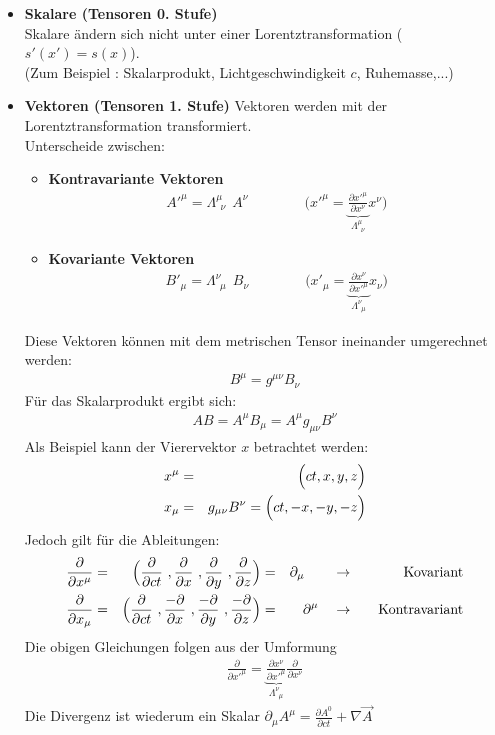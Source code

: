 \begin{itemize}
\item {\bf Skalare (Tensoren 0. Stufe) }\\  Skalare ändern sich nicht unter einer Lorentztransformation ($s'(x') = s(x)$).\\
(Zum Beispiel : Skalarprodukt, Lichtgeschwindigkeit $c$, Ruhemasse,...)
\item {\bf Vektoren (Tensoren 1. Stufe)} Vektoren werden mit der Lorentztransformation transformiert.\\
Unterscheide zwischen:
\begin{itemize}
\item {\bf Kontravariante Vektoren}\\
\begin{eqnarray*} {A'}^{\mu} = \Lambda_{\ \ \nu}^{\mu} \ \ A^{\nu} \qquad \qquad
\big ( {x'}^{\mu} = \underbrace{\frac{\partial {x'}^{\mu}}{\partial x^\nu}}_{\Lambda_{\ \ \nu}^{\mu}} x^{\nu} \big)
\end{eqnarray*}
\item{\bf Kovariante Vektoren}\\ \begin{eqnarray*} B'_{\mu} = \Lambda_{\ \ \mu}^{\nu}\ \ B_{\nu} \qquad \qquad \big ( x'_{\mu} = \underbrace{\frac{\partial x^{\nu}}{\partial {x'}^{\mu}}}_{\Lambda_{\ \ \mu}^{\nu}}x_{\nu} \big )\end{eqnarray*}
\end{itemize}
Diese Vektoren können mit dem metrischen Tensor ineinander umgerechnet werden:
\begin{eqnarray*} B^{\mu} = g^{\mu\nu} B_{\nu}\end{eqnarray*}
Für das Skalarprodukt ergibt sich:
\begin{eqnarray*} AB = A^{\mu}B_{\mu} = A^{\mu} g_{\mu\nu} B^{\nu} \end{eqnarray*}
Als Beispiel kann der Vierervektor $x$ betrachtet werden:
\begin{eqnarray*}
x^{\mu} &=& \Big ( ct, x,y,z \Big)\\ x_{\mu} &=& g_{\mu\nu} B^{\nu} = \Big ( ct, -x,-y,-z\Big)
\end{eqnarray*}
Jedoch gilt für die Ableitungen:
\begin{alignat*}{6} \frac{\partial}{\partial x^{\mu}} \g \Big(\frac{\partial}{\partial ct}\ ,\frac{\partial}{\partial x} \ ,\frac{\partial}{\partial y}\ ,\frac{\partial}{\partial z} \Big ) \g \partial_{\mu} \qquad&\rightarrow& \quad \text{Kovariant}\\
\frac{\partial}{\partial x_{\mu}} \g \Big ( \frac{\partial}{\partial ct}\ ,\frac{-\partial}{\partial x}\ , \frac{-\partial}{\partial y}\ ,\frac{-\partial}{\partial z}\Big ) \g \partial^{\mu} \quad &\rightarrow& \quad \text{Kontravariant}
\end{alignat*}
Die obigen Gleichungen folgen aus der Umformung
\begin{eqnarray*} \frac{\partial}{\partial{x'}^{\mu}} = \underbrace{\frac{\partial x^{\nu}}{\partial{x'}^{\mu}}}_{\Lambda_{\ \ \mu}^{\nu}} \frac{\partial}{\partial x^{\nu}} \end{eqnarray*}
Die Divergenz ist wiederum ein Skalar $\partial_{\mu} A^{\mu} = \frac{\partial A^0}{\partial ct} + \nabla \vec A$


\end{itemize}
